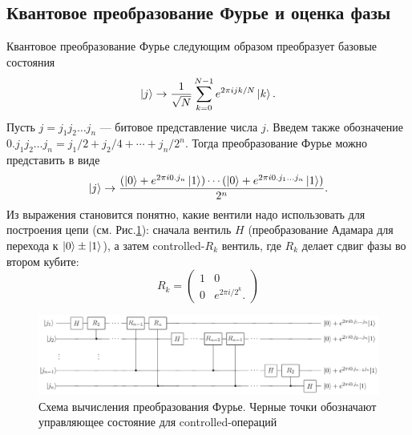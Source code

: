 \documentclass{article}
\theoremstyle{definition}
\begin{document}
\subsection{Квантовое преобразование Фурье и оценка фазы}
Квантовое преобразование Фурье следующим образом преобразует базовые состояния
\[
\ket{j} \rightarrow \frac{1}{\sqrt{N}} \sum_{k=0}^{N-1} e^{2\pi ijk / N} \ket{k}.
\]
Пусть $j = j_1 j_2 \ldots j_n$ --- битовое представление числа $j$.
Введем также обозначение $0.j_1 j_2 \ldots j_n = j_1 / 2 + j_2 / 4 + \cdots + j_n / 2^n$.
Тогда преобразование Фурье можно представить в виде
\[
\ket{j} \rightarrow \frac{(\ket{0} + e^{2\pi i 0.j_n}\ket{1}) \cdots
                          (\ket{0} + e^{2\pi i 0.j_1 \ldots j_n} \ket{1})}{2^n}.
\]
Из выражения становится понятно, какие вентили надо использовать для построения цепи
(см. Рис.\ref{fig:fourier_transform}):
сначала вентиль $H$ (преобразование Адамара для перехода к $\ket{0} \pm \ket{1}$),
а затем controlled-$R_k$ вентиль, где $R_k$ делает сдвиг фазы во втором кубите:
\[
R_k = \begin{pmatrix}
    1 & 0 \\
    0 & e^{2\pi i / 2^k}.
\end{pmatrix}
\]

\begin{figure}[H]
    \centering
    \includegraphics[width=\textwidth]{figures/fourier_transform.png}
    \caption{Схема вычисления преобразования Фурье.
    Черные точки обозначают управляющее состояние для controlled-операций}
    \label{fig:fourier_transform}
\end{figure}


\end{document}
